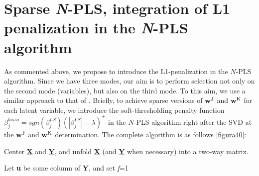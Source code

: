 \section{Sparse \textit{N}-PLS, integration of L1 penalization in the \textit{N}-PLS algorithm}
\label{NPLSpenalization}
As commented above, we propose to introduce the L1-penalization in the $N$-PLS algorithm. Since we have three modes, our aim is to perform selection not only on the second mode (variables), but also on the third mode. To this aim, we use a similar approach to that of \cite{le2008sparse}. Briefly, to achieve sparse versions of $\textbf{\text{w}}^\text{J}$ and $\textbf{\text{w}}^\text{K}$ for each latent variable, we introduce the soft-thresholding penalty function $\beta_j^{lasso}=sgn(\beta_j^{LS})(|\beta_j^{LS}|-\lambda)^+$  in the $N$-PLS algorithm right after the SVD at the $\textbf{\text{w}}^\text{J}$ and $\textbf{\text{w}}^\text{K}$ determination. The complete algorithm is as follows \autoref{figura40}:


\vspace{20pt}
Center \textbf{\underline{X}} and \textbf{\underline{Y}}, and unfold \textbf{\underline{X}} (and \textbf{\underline{Y}} when necessary) into a two-way matrix.

Let \textbf{u} be some column of \textbf{Y}, and set \textit{f}=1

